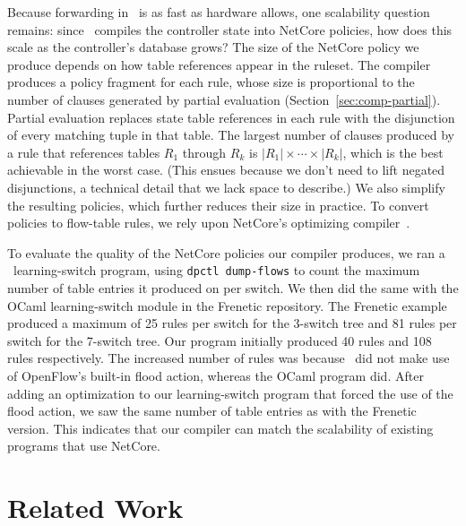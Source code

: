 Because forwarding in \flowlog\ is as fast as hardware allows, 
one scalability question remains:
since \flowlog\ compiles the controller state into NetCore
policies, how does this scale as the controller's
database grows?
The size of the NetCore policy we produce depends on how table references appear in the ruleset. 
The compiler produces a policy fragment for each rule, whose size is
proportional to the number of clauses generated by partial evaluation
(Section~\ref{sec:comp-partial}). Partial evaluation replaces state table
references in each rule with the disjunction of every matching tuple in that
table.
The largest number of 
clauses produced by a rule that references tables $R_1$ through $R_k$ is
$|R_1| \times \cdots \times |R_k|$,
which is the best achievable in the worst case. (This ensues
because we don't need to lift negated disjunctions, a technical detail that we lack
space to describe.)
We also simplify the resulting policies, which further
reduces their size in practice.
To convert policies to flow-table rules, we rely upon NetCore's
optimizing compiler~\cite{monsanto:popl12-netcore}.

To evaluate the quality of the NetCore policies our compiler produces,
we ran a \flowlog\ learning-switch program, using {\tt dpctl
dump-flows} to count the maximum number of table entries it produced on per
switch. We then did the same with the 
OCaml learning-switch module
in the Frenetic repository.
The Frenetic example produced a maximum of 25 rules per switch for the
3-switch tree and 81 rules per switch for the 7-switch tree. Our program
initially produced 40 rules and 108 rules respectively. The increased number
of rules was because \flowlog\ did not make use of OpenFlow's built-in flood
action, whereas the OCaml program did. After adding an optimization to our
learning-switch program that forced the use of the flood action, we saw the
same number of table entries as with the Frenetic version.
This indicates that our compiler can match the scalability of existing programs that use NetCore.



\section{Related Work}
\label{sec:rw}


